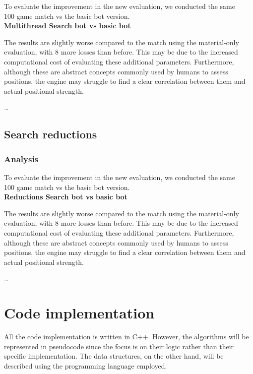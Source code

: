 To evaluate the improvement in the new evaluation, we conducted the same\\
100 game match vs the basic bot version.\\ 

\textbf{Multithread Search bot vs basic bot}\\
\medskip

The results are slightly worse compared to the match using the material-only evaluation, with 8 more losses than before. This may be due to the increased computational cost of evaluating these additional parameters. Furthermore, although these are abstract concepts commonly used by humans to assess positions, the engine may struggle to find a clear correlation between them and actual positional strength.


\ldots

\subsection{Search reductions}

\subsubsection{Analysis}

To evaluate the improvement in the new evaluation, we conducted the same\\
100 game match vs the basic bot version.\\ 

\textbf{Reductions Search bot vs basic bot}\\
\medskip

The results are slightly worse compared to the match using the material-only evaluation, with 8 more losses than before. This may be due to the increased computational cost of evaluating these additional parameters. Furthermore, although these are abstract concepts commonly used by humans to assess positions, the engine may struggle to find a clear correlation between them and actual positional strength.


\ldots

\section{Code implementation}
\label{sec:code}

All the code implementation is written in C++. However, the algorithms will be represented in pseudocode since the focus is on their logic rather than their specific implementation. The data structures, on the other hand, will be described using the programming language employed.


